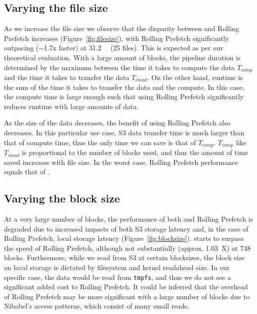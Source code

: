 \subsection{Varying the file size}
As we increase the file size we observe that the disparity between \sfs and
Rolling Prefetch increases (Figure~\ref{fig:filesize}), with Rolling Prefetch significantly outpacing ($\sim$1.7x faster) 
\sfs at \SI{31.2}{\gibi\byte} (25 files). This is expected as per our theoretical evaluation. With a large amount of blocks, the pipeline duration is determined by the maximum between the time it takes to
compute the data $T_{comp}$ and the time it takes to transfer the data $T_{cloud}$. On the other hand, \sfs runtime is the sum of the time it takes to transfer the data and the compute. In this case, the compute time is large enough such that using Rolling Prefetch significantly reduces runtime with large amounts of data.

As the size of the data decreases, the benefit of using Rolling Prefetch also decreases. 
In this particular use case, S3 data transfer time is much larger
than that of compute time, thus the only time we can save is that of $T_{comp}$. $T_{comp}$ like ${T_{cloud}}$ is
proportional to the number of blocks used, and thus the amount of time saved increases with file size. In the 
worst case, Rolling Prefetch performance equals that of \sfs.

\subsection{Varying the block size}%

At a very large number of blocks, the performance of both \sfs and Rolling Prefetch is degraded due to
increased impacts of both S3 storage latency and, in the case of Rolling Prefetch, local storage latency (Figure~\ref{fig:blocksize}).  \sfs starts to surpass the speed of Rolling Prefetch, although not substantially (approx. 1.03~X) at 748 blocks.  Furthermore, while we read from S3
at certain blocksizes, the block size on local storage is dictated by filesystem and kernel readahead 
size. In our specific case, the data would be read from \texttt{tmpfs}, and thus we do not see a significant added cost
to Rolling Prefetch. It could be inferred that the overhead of Rolling Prefetch may be more significant with a large
number of blocks due to Nibabel's access patterns, which consist of many small reads.

